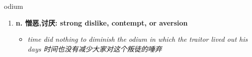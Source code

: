 
\begin{frame}
{\huge odium}
\begin{center}
\begin{enumerate}\Large
  \item \textbf{n. 憎恶,讨厌: strong dislike, contempt, or aversion}
  \begin{itemize}
    \item \em{\Large{time did nothing to diminish the odium in which the traitor lived out his days 时间也没有减少大家对这个叛徒的唾弃}}
  \end{itemize}
\end{enumerate}
\end{center}
\end{frame}
